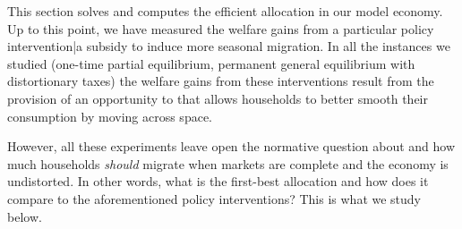 \documentclass[12pt,pdftex]{article}
\begin{document}
\begin{onehalfspacing}
\newpage

\normalsize

This section solves and computes the efficient allocation in our model economy. Up to this point, we have measured the welfare gains from a particular policy intervention|a subsidy to induce more seasonal migration. In all the instances we studied (one-time partial equilibrium, permanent general equilibrium with distortionary taxes) the welfare gains from these interventions result from the provision of an opportunity to that allows households to better smooth their consumption by moving across space.

However, all these experiments leave open the normative question about and how much households \emph{should} migrate when markets are complete and the economy is undistorted. In other words, what is the first-best allocation and how does it compare to the aforementioned policy interventions? This is what we study below.


\newpage


\end{onehalfspacing}
\end{document}
